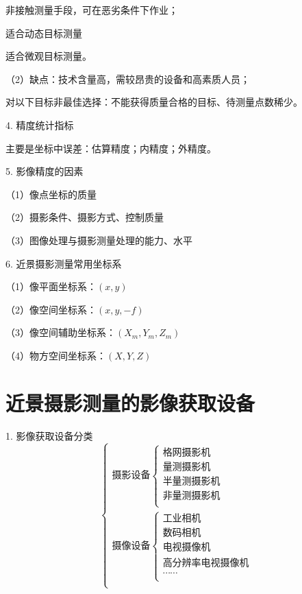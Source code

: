 \documentclass[a4paper]{ctexart}
\begin{document}
非接触测量手段，可在恶劣条件下作业；

适合动态目标测量

适合微观目标测量。

（2）缺点：技术含量高，需较昂贵的设备和高素质人员；

对以下目标非最佳选择：不能获得质量合格的目标、待测量点数稀少。

4. 精度统计指标

主要是坐标中误差：估算精度；内精度；外精度。

5. 影像精度的因素

（1）像点坐标的质量

（2）摄影条件、摄影方式、控制质量

（3）图像处理与摄影测量处理的能力、水平

6. 近景摄影测量常用坐标系

（1）像平面坐标系：$(x,y)$

（2）像空间坐标系：$(x,y,-f)$

（3）像空间辅助坐标系：$(X_m,Y_m,Z_m)$

（4）物方空间坐标系：$(X,Y,Z)$
\section{近景摄影测量的影像获取设备}
1. 影像获取设备分类
$$
\begin{cases}
	\text{摄影设备}\begin{cases}
	\text{格网摄影机}\\
	\text{量测摄影机}\\
	\text{半量测摄影机}\\
	\text{非量测摄影机}\\
\end{cases}\\
	\text{摄像设备}\begin{cases}
	\text{工业相机}\\
	\text{数码相机}\\
	\text{电视摄像机}\\
	\text{高分辨率电视摄像机}\\
	\cdots \cdots\\
\end{cases}\\
\end{cases}
$$
\end{document}
